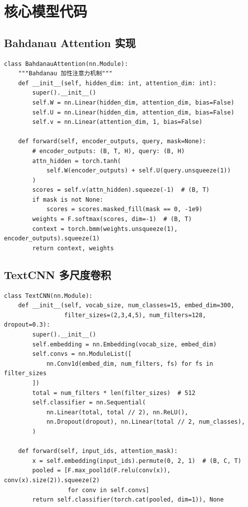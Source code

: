 \section{核心模型代码}

\subsection{Bahdanau Attention 实现}

\begin{lstlisting}[style=cleanpython]
class BahdanauAttention(nn.Module):
    """Bahdanau 加性注意力机制"""
    def __init__(self, hidden_dim: int, attention_dim: int):
        super().__init__()
        self.W = nn.Linear(hidden_dim, attention_dim, bias=False)
        self.U = nn.Linear(hidden_dim, attention_dim, bias=False)
        self.v = nn.Linear(attention_dim, 1, bias=False)

    def forward(self, encoder_outputs, query, mask=None):
        # encoder_outputs: (B, T, H), query: (B, H)
        attn_hidden = torch.tanh(
            self.W(encoder_outputs) + self.U(query.unsqueeze(1))
        )
        scores = self.v(attn_hidden).squeeze(-1)  # (B, T)
        if mask is not None:
            scores = scores.masked_fill(mask == 0, -1e9)
        weights = F.softmax(scores, dim=-1)  # (B, T)
        context = torch.bmm(weights.unsqueeze(1), encoder_outputs).squeeze(1)
        return context, weights
\end{lstlisting}

\subsection{TextCNN 多尺度卷积}

\begin{lstlisting}[style=cleanpython]
class TextCNN(nn.Module):
    def __init__(self, vocab_size, num_classes=15, embed_dim=300,
                 filter_sizes=(2,3,4,5), num_filters=128, dropout=0.3):
        super().__init__()
        self.embedding = nn.Embedding(vocab_size, embed_dim)
        self.convs = nn.ModuleList([
            nn.Conv1d(embed_dim, num_filters, fs) for fs in filter_sizes
        ])
        total = num_filters * len(filter_sizes)  # 512
        self.classifier = nn.Sequential(
            nn.Linear(total, total // 2), nn.ReLU(),
            nn.Dropout(dropout), nn.Linear(total // 2, num_classes),
        )

    def forward(self, input_ids, attention_mask):
        x = self.embedding(input_ids).permute(0, 2, 1)  # (B, C, T)
        pooled = [F.max_pool1d(F.relu(conv(x)), conv(x).size(2)).squeeze(2)
                  for conv in self.convs]
        return self.classifier(torch.cat(pooled, dim=1)), None
\end{lstlisting}
